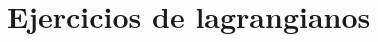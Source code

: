 \documentclass[]{report}
\numberwithin{equation}{section}
\newcommand{\0}{\textcolor{gray}{0}}
\begin{document}
\begin{enumerate}
	
\end{enumerate}

\chapter{Ejercicios de lagrangianos}
\end{document}
